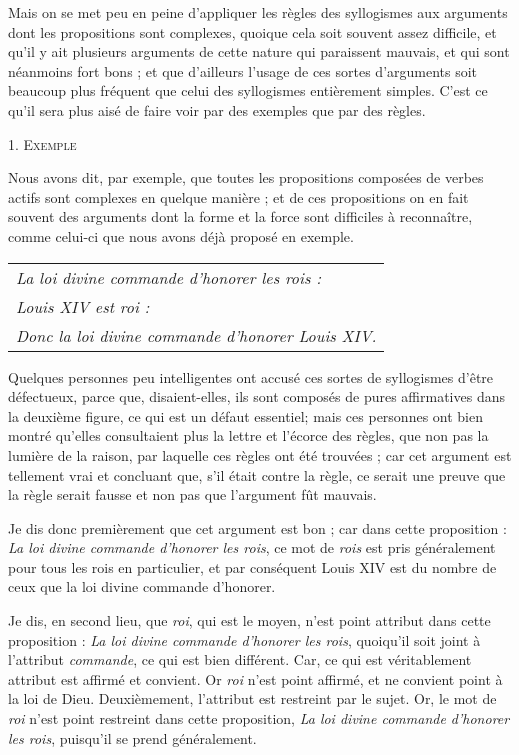 Mais on se met peu en peine d'appliquer les règles des syllogismes aux arguments dont les propositions sont complexes, quoique cela soit souvent assez difficile, et qu'il y ait plusieurs arguments de cette nature qui paraissent mauvais, et qui sont néanmoins fort bons ; et que d'ailleurs l'usage de ces sortes d'arguments soit beaucoup plus fréquent que celui des syllogismes entièrement simples. C'est ce qu'il sera plus aisé de faire voir par des exemples que par des règles.

\begin{center}{\scshape 1. Exemple}\end{center}

Nous avons dit, par exemple, que toutes les propositions composées de verbes actifs sont complexes en quelque manière ; et de ces propositions on en fait souvent des arguments dont la forme et la force sont difficiles à reconnaître, comme celui-ci que nous avons déjà proposé en exemple.

	\begin{tabularx}{\textwidth}{X}
		\emph{La loi divine commande d'honorer les rois : } \\
		\emph{Louis XIV est roi :}  \\
		\emph{Donc la loi divine commande d'honorer Louis XIV.} \\
	\end{tabularx}

Quelques personnes peu intelligentes ont accusé ces sortes de syllogismes d'être défectueux, parce que, disaient-elles, ils sont composés de pures affirmatives dans la deuxième figure, ce qui est un défaut essentiel; mais ces personnes ont bien montré qu'elles consultaient plus la lettre et l'écorce des règles, que non pas la lumière de la raison, par laquelle ces règles ont été trouvées ; car cet argument est tellement vrai et concluant que, s'il était contre la règle, ce serait une preuve que la règle serait fausse et non pas que l'argument fût mauvais.

Je dis donc premièrement que cet argument est bon ; car dans cette proposition : \emph{La loi divine commande d'honorer les rois}, ce mot de \emph{rois} est pris généralement pour tous les rois en particulier, et par conséquent Louis XIV est du nombre de ceux que la loi divine commande d'honorer.

Je dis, en second lieu, que \emph{roi}, qui est le moyen, n'est point attribut dans cette proposition : \emph{La loi divine commande d'honorer les rois}, quoiqu'il soit joint à l'attribut \emph{commande}, ce qui est bien différent. Car, ce qui est véritablement attribut est affirmé et convient. Or \emph{roi} n'est point affirmé, et ne convient point à la loi de Dieu. Deuxièmement, l'attribut est restreint par le sujet. Or, le mot de \emph{roi} n'est point restreint dans cette proposition, \emph{La loi divine commande d'honorer les rois}, puisqu'il se prend généralement.

